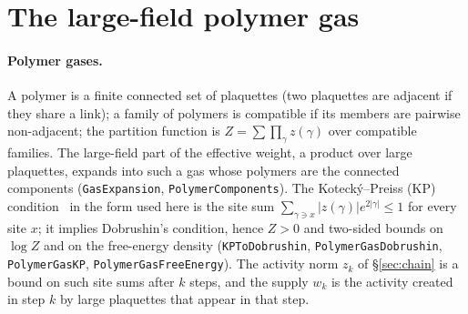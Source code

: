 \documentclass[11pt,a4paper]{article}
\theoremstyle{definition}
\theoremstyle{remark}
\newcommand{\lt}[1]{\texttt{#1}}
\begin{document}
\section{The large-field polymer gas}\label{app:gas}

\paragraph{Polymer gases.} A polymer is a finite connected set of plaquettes (two plaquettes are adjacent if they share a link); a family of polymers is compatible if its members are pairwise non-adjacent; the partition function is $Z=\sum\prod_\gamma z(\gamma)$ over compatible families. The large-field part of the effective weight, a product over large plaquettes, expands into such a gas whose polymers are the connected components (\lt{GasExpansion}, \lt{PolymerComponents}). The Kotecký--Preiss (KP) condition~\cite{KP} in the form used here is the site sum $\sum_{\gamma\ni x}|z(\gamma)|e^{2|\gamma|}\le1$ for every site $x$; it implies Dobrushin's condition, hence $Z>0$ and two-sided bounds on $\log Z$ and on the free-energy density (\lt{KPToDobrushin}, \lt{PolymerGasDobrushin}, \lt{PolymerGasKP}, \lt{PolymerGasFreeEnergy}). The activity norm $z_k$ of \S\ref{sec:chain} is a bound on such site sums after $k$ steps, and the supply $w_k$ is the activity created in step $k$ by large plaquettes that appear in that step.
\end{document}
